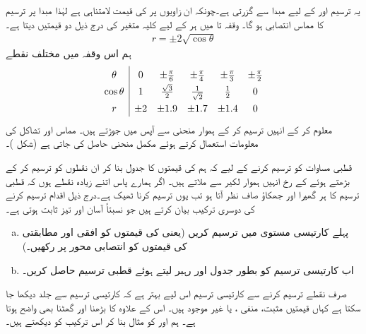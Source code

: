 یہ ترسیم  اور  کے لیے مبدا سے گزرتی ہے۔چونکہ ان زاویوں پر  کی قیمت لامتناہی ہے لہٰذا مبدا پر ترسیم کا مماس انتصابی ہو گا۔ وقفہ  تا  میں ہر  کے لیے  کلیہ  متغیر  کی درج ذیل دو قیمتیں دیتا ہے۔
\begin{align*}
r=\pm 2\sqrt{\cos\theta}
\end{align*}
ہم اس وقفہ میں مختلف نقطے
\begin{align*}
\renewcommand{\arraystretch}{1.4}
\begin{array}{c|ccccc}
\theta&0&\pm\tfrac{\pi}{6}&\pm\tfrac{\pi}{4}&\pm\tfrac{\pi}{3}&\pm\tfrac{\pi}{2}\\
\cos\theta&1&\tfrac{\sqrt{3}}{2}&\tfrac{1}{\sqrt{2}}&\tfrac{1}{2}&0\\
r&\pm 2&\pm 1.9&\pm 1.7&\pm 1.4&0
\end{array}
\end{align*}
 معلوم کر کے  انہیں ترسیم کر کے ہموار منحنی سے آپس میں جوڑتے ہیں۔ مماس اور تشاکل  کی معلومات استعمال کرتے ہوئے مکمل منحنی حاصل کی جاتی ہے (شکل )۔ 

قطبی مساوات  کو ترسیم کرنے کے لیے کہ ہم  کی قیمتوں کا جدول بنا کر ان نقطوں کو ترسیم کر کے بڑھتے ہوئے    کے رخ انہیں ہموار لکیر سے ملاتے ہیں۔ اگر ہمارے پاس اتنے زیادہ نقطے ہوں کہ قطبی ترسیم کا ہر گھیرا اور جھکاؤ صاف نظر آتا ہو تب یوں ترسیم کرنا ٹھیک ہے۔درج ذیل اقدام ترسیم کرنے  کی  دوسری ترکیب بیان کرتے ہیں جو نسبتاً آسان اور تیز ثابت ہوتی ہے۔
\begin{enumerate}[a.]
\item
پہلے کارتیسی  مستوی میں  ترسیم کریں (یعنی  کی قیمتوں کو افقی اور مطابقتی  کی قیمتوں کو انتصابی محور پر رکھیں۔) 
\item
اب کارتیسی ترسیم کو بطور جدول اور رہبر  لیتے ہوئے قطبی ترسیم حاصل کریں۔ 
\end{enumerate}

صرف نقطے ترسیم کرنے سے کارتیسی ترسیم اس لیے بہتر ہے کہ کارتیسی ترسیم سے جلد دیکھا جا سکتا ہے کہاں قیمتیں مثبت، منفی ، یا غیر موجود  ہیں۔ اس کے علاوہ  کا بڑھنا اور گھٹنا بھی واضح ہوتا ہے۔ ہم  اور  کو مثال بنا کر اس ترکیب کو دیکھتے ہیں۔

